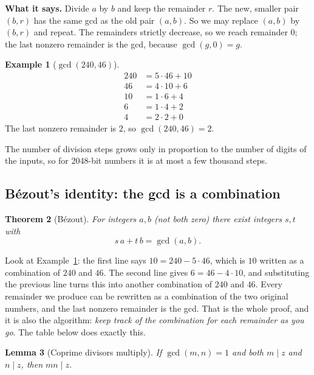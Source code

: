 \documentclass[11pt]{article}
\newtheorem{theorem}{Theorem}[section]
\newtheorem{lemma}[theorem]{Lemma}
\theoremstyle{definition}
\newtheorem{example}[theorem]{Example}
\theoremstyle{remark}
\begin{document}
\textbf{What it says.} Divide $a$ by $b$ and keep the remainder $r$. The new, smaller pair $(b,r)$ has the same gcd as the old pair $(a,b)$. So we may replace $(a,b)$ by $(b,r)$ and repeat. The remainders strictly decrease, so we reach remainder $0$; the last nonzero remainder is the gcd, because $\gcd(g,0)=g$.

\begin{example}[$\gcd(240,46)$]\label{ex:gcd240}
\begin{align*}
240 &= 5\cdot 46 + 10\\
46 &= 4\cdot 10 + 6\\
10 &= 1\cdot 6 + 4\\
6 &= 1\cdot 4 + 2\\
4 &= 2\cdot 2 + 0
\end{align*}
The last nonzero remainder is $2$, so $\gcd(240,46)=2$.
\end{example}

The number of division steps grows only in proportion to the number of digits of the inputs, so for 2048-bit numbers it is at most a few thousand steps.

\subsection{B\'ezout's identity: the gcd is a combination}

\begin{theorem}[B\'ezout]\label{thm:bezout}
For integers $a,b$ (not both zero) there exist integers $s,t$ with
\[
s\,a+t\,b=\gcd(a,b).
\]
\end{theorem}

Look at Example~\ref{ex:gcd240}: the first line says $10=240-5\cdot46$, which is $10$ written as a combination of $240$ and $46$. The second line gives $6=46-4\cdot10$, and substituting the previous line turns this into another combination of $240$ and $46$. Every remainder we produce can be rewritten as a combination of the two original numbers, and the last nonzero remainder is the gcd. That is the whole proof, and it is also the algorithm: \emph{keep track of the combination for each remainder as you go}. The table below does exactly this.

\begin{lemma}[Coprime divisors multiply]\label{lem:coprime-div}
If $\gcd(m,n)=1$ and both $m\mid z$ and $n\mid z$, then $mn\mid z$.
\end{lemma}
\end{document}
